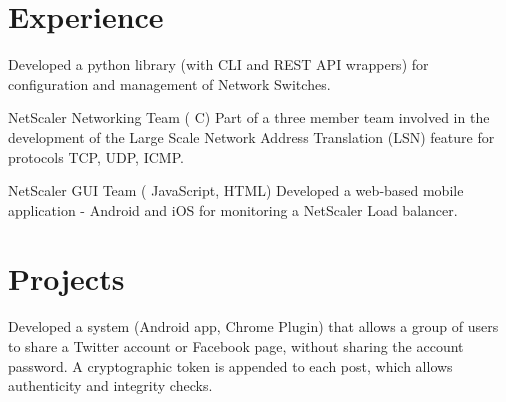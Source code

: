 \documentclass[]{deedy-resume-openfont}
\begin{document}
\hfill
\begin{minipage}[t]{0.69\textwidth} 


\section{Experience}

\vspace{\topsep} %
\begin{tightemize}
\item
Developed
a
python
library
(with
CLI
and
REST
API
wrappers)
for configuration and 
management
of
Network Switches.
\end{tightemize}
\sectionsep

\begin{tightemize}
\item NetScaler
Networking
Team
(
C)
Part of a three member team
involved
in
the
development
of
the
Large
Scale
Network
Address
Translation
(LSN)
feature
for
protocols
TCP,
UDP,
ICMP.
\item NetScaler
GUI
Team
(
JavaScript,
HTML)
Developed a
web‐based
mobile
application -
Android
and
iOS
for
monitoring
a
NetScaler
Load
balancer.
\end{tightemize}
\sectionsep

\begin{tightemize}
\end{tightemize}
\sectionsep


\section{Projects}
Developed a system (Android app, Chrome Plugin) that
allows
a
group
of
users
to
share
a
Twitter
account
or
Facebook
page,
without
sharing
the
account
password.
A
cryptographic
token
is
appended
to
each
post,
which
allows authenticity and integrity checks.
\sectionsep


\end{minipage}
\end{document}
